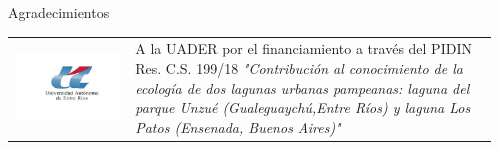 \documentclass[final]{beamer}
\newlength{\sepmargin}
\newlength{\onecolwid}
\begin{document}
\begin{frame}[t]
\begin{columns}[t]
\begin{column}{\onecolwid}
\begin{block}{ }
		\end{block}
      \end{column}
      
      \begin{column}{\sepmargin} \end{column}
      \end{columns} 
       
      \begin{columns}[t] %
      
      \begin{column}{\sepmargin} \end{column}
        \begin{column}{\onecolwid} %
			\begin{block}{\large Agradecimientos}
                    \begin{center}
						\begin{tabular}{SL}
							\includegraphics[width=\linewidth]{uader.jpg}  &
							\footnotesize A la UADER por el financiamiento a través del PIDIN Res. C.S. 199/18 \textit{"Contribución al conocimiento de la ecología de dos lagunas urbanas pampeanas: laguna del parque Unzué (Gualeguaychú,Entre Ríos) y laguna Los Patos (Ensenada, Buenos Aires)"}
						\end{tabular}
					\end{center}
				\end{block}	
                \vspace*{-0.9cm}


\end{column}
\end{columns}
\end{frame}
\end{document}
